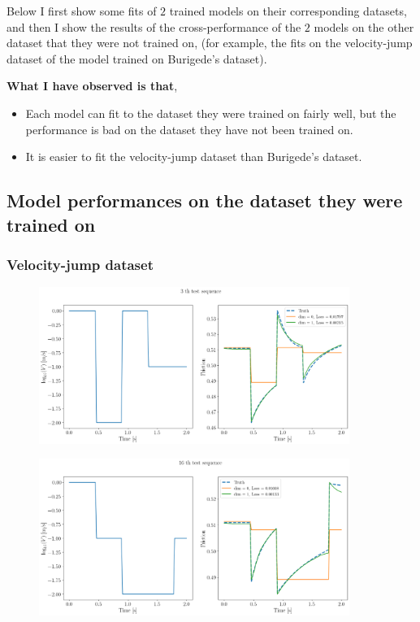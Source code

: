 Below I first show some fits of $2$ trained models on their corresponding datasets, 
and then I show the results of the cross-performance of the $2$ models on the other dataset that they were not trained on, (for example, the fits on the velocity-jump dataset of the model trained on Burigede's dataset). 

\noindent \textbf{What I have observed is that}, 
\begin{itemize}
    \item Each model can fit to the dataset they were trained on fairly well, 
    but the performance is bad on the dataset they have not been trained on.
    \item It is easier to fit the velocity-jump dataset than Burigede's dataset. 
\end{itemize}

\newpage
\subsection{Model performances on the dataset they were trained on}
\subsubsection{Velocity-jump dataset}
\begin{figure}[H]
    \centering
    \includegraphics[width=0.9\textwidth]{images/dtTSqJump1204_1.png}
    \label{fig:dtTSqJump1204_1}
\end{figure}

\begin{figure}[H]
    \centering
    \includegraphics[width=0.9\textwidth]{images/dtTSqJump1204_2.png}
    \label{fig:dtTSqJump1204_2}
\end{figure}

